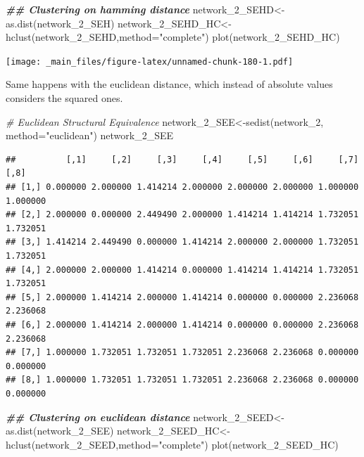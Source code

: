 \documentclass[
  notitlepage,
  onecolumn,
  openany]{book}
\newenvironment{Shaded}{\begin{snugshade}}{\end{snugshade}}
\newcommand{\AttributeTok}[1]{\textcolor[rgb]{0.77,0.63,0.00}{#1}}
\newcommand{\CommentTok}[1]{\textcolor[rgb]{0.56,0.35,0.01}{\textit{#1}}}
\newcommand{\DocumentationTok}[1]{\textcolor[rgb]{0.56,0.35,0.01}{\textbf{\textit{#1}}}}
\newcommand{\FunctionTok}[1]{\textcolor[rgb]{0.00,0.00,0.00}{#1}}
\newcommand{\NormalTok}[1]{#1}
\newcommand{\OtherTok}[1]{\textcolor[rgb]{0.56,0.35,0.01}{#1}}
\newcommand{\StringTok}[1]{\textcolor[rgb]{0.31,0.60,0.02}{#1}}
\begin{document}
\begin{Shaded}
\begin{Highlighting}[]
\DocumentationTok{\#\# Clustering on hamming distance}
\NormalTok{network\_2\_SEHD}\OtherTok{\textless{}{-}}\FunctionTok{as.dist}\NormalTok{(network\_2\_SEH)}
\NormalTok{network\_2\_SEHD\_HC}\OtherTok{\textless{}{-}}\FunctionTok{hclust}\NormalTok{(network\_2\_SEHD,}\AttributeTok{method=}\StringTok{"complete"}\NormalTok{)}
\FunctionTok{plot}\NormalTok{(network\_2\_SEHD\_HC)}
\end{Highlighting}
\end{Shaded}

\texttt{[image: \_main\_files/figure-latex/unnamed-chunk-180-1.pdf]}

Same happens with the euclidean distance, which instead of absolute values considers the squared ones.

\begin{Shaded}
\begin{Highlighting}[]
\CommentTok{\# Euclidean Structural Equivalence}
\NormalTok{network\_2\_SEE}\OtherTok{\textless{}{-}}\FunctionTok{sedist}\NormalTok{(network\_2, }\AttributeTok{method=}\StringTok{"euclidean"}\NormalTok{)}
\NormalTok{network\_2\_SEE}
\end{Highlighting}
\end{Shaded}

\begin{verbatim}
##          [,1]     [,2]     [,3]     [,4]     [,5]     [,6]     [,7]     [,8]
## [1,] 0.000000 2.000000 1.414214 2.000000 2.000000 2.000000 1.000000 1.000000
## [2,] 2.000000 0.000000 2.449490 2.000000 1.414214 1.414214 1.732051 1.732051
## [3,] 1.414214 2.449490 0.000000 1.414214 2.000000 2.000000 1.732051 1.732051
## [4,] 2.000000 2.000000 1.414214 0.000000 1.414214 1.414214 1.732051 1.732051
## [5,] 2.000000 1.414214 2.000000 1.414214 0.000000 0.000000 2.236068 2.236068
## [6,] 2.000000 1.414214 2.000000 1.414214 0.000000 0.000000 2.236068 2.236068
## [7,] 1.000000 1.732051 1.732051 1.732051 2.236068 2.236068 0.000000 0.000000
## [8,] 1.000000 1.732051 1.732051 1.732051 2.236068 2.236068 0.000000 0.000000
\end{verbatim}

\begin{Shaded}
\begin{Highlighting}[]
\DocumentationTok{\#\# Clustering on euclidean distance}
\NormalTok{network\_2\_SEED}\OtherTok{\textless{}{-}}\FunctionTok{as.dist}\NormalTok{(network\_2\_SEE)}
\NormalTok{network\_2\_SEED\_HC}\OtherTok{\textless{}{-}}\FunctionTok{hclust}\NormalTok{(network\_2\_SEED,}\AttributeTok{method=}\StringTok{"complete"}\NormalTok{)}
\FunctionTok{plot}\NormalTok{(network\_2\_SEED\_HC)}
\end{Highlighting}
\end{Shaded}
\end{document}
